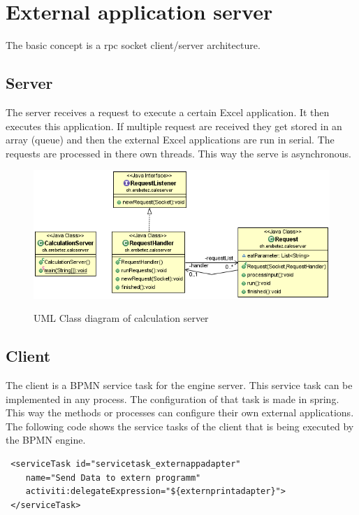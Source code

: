 \documentclass[paper=a4,twoside=false,BCOR=0mm,DIV=calc,fontsize=12pt]{scrartcl}
\begin{document}
\section{External application server}
The basic concept is a rpc socket client/server architecture. \cite{rpc}

\subsection{Server}
The server receives a request to execute a certain Excel application. It then executes this application. If multiple request are received they get stored in an array (queue) and then the external Excel applications are run in serial. 
The requests are processed in there own threads. This way the serve is asynchronous.

\begin{figure}
    \begin{center}
       \includegraphics[width=1\textwidth]{./img/calcServerUML.png}\\
    \end{center}
  \caption{UML Class diagram of calculation server}
  \label{uml_calculationserver}
\end{figure} 


\subsection{Client}
The client is a BPMN service task for the engine server. This service task can be implemented in any process. 
The configuration of that task is made in spring. This way the methods or processes can configure their own external applications. The following code shows the service tasks of the client that is being executed by the BPMN engine.
\begin{verbatim}
 <serviceTask id="servicetask_externappadapter" 
    name="Send Data to extern programm"
    activiti:delegateExpression="${externprintadapter}">
 </serviceTask>
\end{verbatim}
\end{document}
